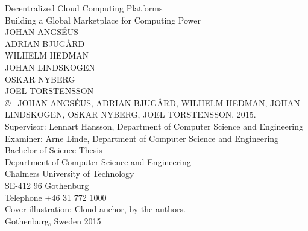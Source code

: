 \newpage
\thispagestyle{plain}
\vspace*{4.5cm}
\noindent Decentralized Cloud Computing Platforms\\
Building a Global Marketplace for Computing Power\\
JOHAN ANGSÉUS\\
ADRIAN BJUGÅRD\\
WILHELM HEDMAN\\
JOHAN LINDSKOGEN\\
OSKAR NYBERG\\
JOEL TORSTENSSON\\[0.5cm]

\noindent \copyright ~ JOHAN ANGSÉUS, ADRIAN BJUGÅRD, WILHELM HEDMAN, JOHAN LINDSKOGEN, OSKAR NYBERG, JOEL TORSTENSSON, 2015.\\[0.5cm]

\noindent Supervisor: Lennart Hansson, Department of Computer Science and Engineering\\
Examiner: Arne Linde, Department of Computer Science and Engineering
\\[0.5cm]

\noindent Bachelor of Science Thesis\\
Department of Computer Science and Engineering\\
Chalmers University of Technology\\
SE-412 96 Gothenburg\\
Telephone +46 31 772 1000\\

\vfill
\noindent Cover illustration: Cloud anchor, by the authors. \\

\noindent Gothenburg, Sweden 2015
